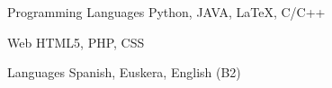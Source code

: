 


\begin{cvskills}


\cvskill
{Programming Languages} %
{Python, JAVA, LaTeX, C/C++} %


\cvskill
{Web} %
{HTML5, PHP, CSS} %


\cvskill
{Languages} %
{Spanish, Euskera, English (B2)} %


\end{cvskills}